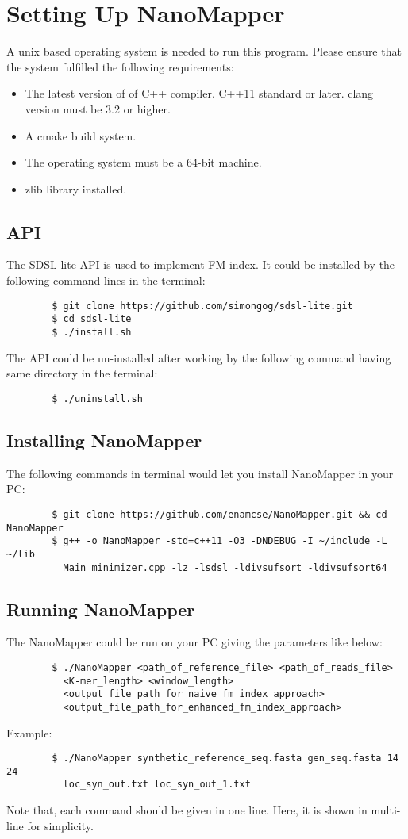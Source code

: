 \documentclass{standalone}
\begin{document}
	\chapter{Setting Up NanoMapper}
	A unix based operating system is needed to run this program. Please ensure that the system fulfilled the following requirements:
	\begin{itemize}
		\item The latest version of of C++ compiler. C++11 standard or later. clang version must be 3.2 or higher.
		\item A cmake build system.
		\item The operating system must be a 64-bit machine.
		\item zlib library installed.
	\end{itemize}
	\section{API}
	The SDSL-lite\cite{SDSL} API is used to implement FM-index. It could be installed by the following command lines in the terminal:
	\begin{verbatim}
	    $ git clone https://github.com/simongog/sdsl-lite.git
	    $ cd sdsl-lite
	    $ ./install.sh
	\end{verbatim}
	The API could be un-installed after working by the following command having same directory in the terminal:
	\begin{verbatim}
	    $ ./uninstall.sh
	\end{verbatim}
	\section{Installing NanoMapper}
	The following commands in terminal would let you install NanoMapper in your PC:
	\begin{verbatim}
	    $ git clone https://github.com/enamcse/NanoMapper.git && cd NanoMapper
	    $ g++ -o NanoMapper -std=c++11 -O3 -DNDEBUG -I ~/include -L ~/lib 
	      Main_minimizer.cpp -lz -lsdsl -ldivsufsort -ldivsufsort64
	\end{verbatim}
	\section{Running NanoMapper}
	The NanoMapper could be run on your PC giving the parameters like below:
	\begin{verbatim}
	    $ ./NanoMapper <path_of_reference_file> <path_of_reads_file> 
	      <K-mer_length> <window_length> 
	      <output_file_path_for_naive_fm_index_approach>
	      <output_file_path_for_enhanced_fm_index_approach>
	\end{verbatim}
	Example:
	\begin{verbatim}
	    $ ./NanoMapper synthetic_reference_seq.fasta gen_seq.fasta 14 24 
	      loc_syn_out.txt loc_syn_out_1.txt
	\end{verbatim}
	Note that, each command should be given in one line. Here, it is shown in multi-line for simplicity.
\end{document}

